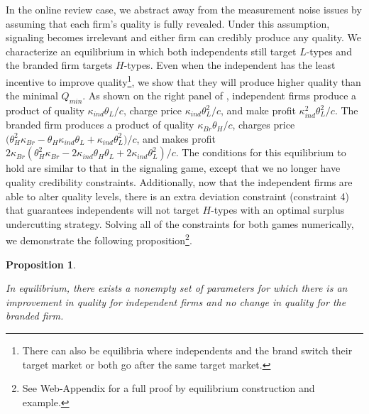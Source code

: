 \documentclass[mksc,blindrev]{informs3} %
\newtheorem{prop}{Proposition}
\begin{document}
In the online review case, we abstract away from the measurement noise issues by assuming that each firm's quality is fully revealed. Under this assumption, signaling becomes irrelevant and either firm can credibly produce any quality. We characterize an equilibrium in which both independents still target $L$-types and the branded firm targets $H$-types. Even when the independent has the least incentive to improve quality\footnote{There can also be equilibria where independents and the brand switch their target market or both go after the same target market.}, we show that they will produce higher quality than the minimal $Q_{min}$. As shown on the right panel of , independent firms produce a product of quality $\kappa_{ind}\theta_L/c$, charge price $\kappa_{ind}\theta_L^2/c$, and make profit $\kappa_{ind}^2\theta_L^2/c$. The branded firm produces a product of quality $\kappa_{Br}\theta_H/c$, charges price $\big(\theta_H^2 \kappa_{Br}-\theta_H \kappa_{ind} \theta_L+\kappa_{ind} \theta_L^2\big)/c$, and makes profit $2 \kappa_{Br} (\theta_H^2 \kappa_{Br}-2 \kappa_{ind} \theta_H \theta_L+2 \kappa_{ind} \theta_L^2)/c$. The conditions for this equilibrium to hold are similar to that in the signaling game, except that we no longer have quality credibility constraints. Additionally, now that the independent firms are able to alter quality levels, there is an extra deviation constraint (constraint 4) that guarantees independents will not target $H$-types with an optimal surplus undercutting strategy. Solving all of the constraints for both games numerically, we demonstrate the following proposition\footnote{See Web-Appendix for a full proof by equilibrium construction and example.}.

\begin{prop}\label{thm:nonempty}
\begin{enumerate}
In equilibrium, there exists a nonempty set of parameters for which there is an improvement in quality for independent firms and no change in quality for the branded firm.
\end{enumerate}
\end{prop}
\end{document}
